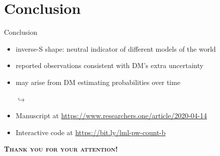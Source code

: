 \section{Conclusion}

\begin{frame}{Conclusion}
\bi
	\item	{}
\ei
{}
\begin{itemize}
  \item inverse-S shape: neutral indicator of different models of the world
	\item reported observations consistent with DM's extra uncertainty
	\item may arise from DM estimating probabilities over time
  \item[$\hookrightarrow$] 
  \item[]
  \item Manuscript at \url{https://www.researchers.one/article/2020-04-14}
  \item Interactive code at \url{https://bit.ly/lml-pw-count-b}    
\end{itemize}


\pause
\centering
\vfill
{\Large \textsc{\textbf{Thank you for your attention!}}}

\end{frame}
